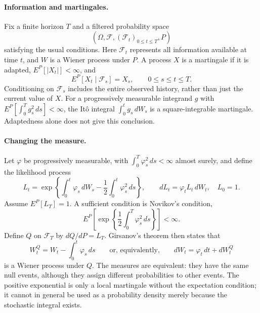 \paragraph*{Information and martingales.}
Fix a finite horizon $T$ and a filtered probability space
\[
 (\Omega,\mathcal F,(\mathcal F_t)_{0\le t\le T},P)
\]
satisfying the usual conditions.
Here $\mathcal F_t$ represents all information available at time $t$, and $W$ is a Wiener process under $P$.
A process $X$ is a martingale if it is adapted, $E^P[|X_t|]<\infty$, and
\[
 E^P[X_t\mid\mathcal F_s]=X_s,\qquad 0\le s\le t\le T.
\]
Conditioning on $\mathcal F_s$ includes the entire observed history, rather than just the current value of $X$.
For a progressively measurable integrand $g$ with $E^P[\int_0^T g_s^2\,ds]<\infty$, the It\^o integral $\int_0^t g_s\,dW_s$ is a square-integrable martingale.
Adaptedness alone does not give this conclusion.

\paragraph*{Changing the measure.}
Let $\varphi$ be progressively measurable, with $\int_0^T\varphi_s^2\,ds<\infty$ almost surely, and define the likelihood process
\begin{equation}\label{eq:rn-density}
 L_t=\exp\left\{\int_0^t\varphi_s\,dW_s-\frac12\int_0^t\varphi_s^2\,ds\right\},
 \qquad dL_t=\varphi_tL_t\,dW_t,\quad L_0=1.
\end{equation}
Assume $E^P[L_T]=1$.
A sufficient condition is Novikov's condition,
\[
 E^P\left[\exp\left\{\frac12\int_0^T\varphi_s^2\,ds\right\}\right]<\infty.
\]
Define $Q$ on $\mathcal F_T$ by $dQ/dP=L_T$.
Girsanov's theorem\cite{Girsanov1960} then states that
\begin{equation}\label{eq:girsanov}
 W_t^Q=W_t-\int_0^t\varphi_s\,ds
 \qquad\text{or, equivalently,}\qquad dW_t=\varphi_t\,dt+dW_t^Q
\end{equation}
is a Wiener process under $Q$.
The measures are equivalent: they have the same null events, although they assign different probabilities to other events.
The positive exponential is only a local martingale without the expectation condition; it cannot in general be used as a probability density merely because the stochastic integral exists.

